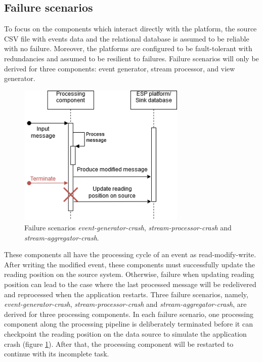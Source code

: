  
\subsection{Failure scenarios}  \label{subsection:failurescenarios}
To focus on the components which interact directly with the platform, the source CSV file with events data and the relational database is assumed to be reliable with no failure. Moreover, the platforms are configured to be fault-tolerant with redundancies and assumed to be resilient to failures.  Failure scenarios will only be derived for three components: event generator, stream processor, and view generator.

\begin{figure}[h]
	\centering
	\includegraphics[width=8cm]{images/reading-position-fail.png}
	\caption{Failure scenarios \emph{event-generator-crash}, \emph{stream-processor-crash} and \emph{stream-aggregator-crash}.}
	\label{fig:scenarioreadingposition}
\end{figure}

These components all have the processing cycle of an event as read-modify-write. After writing the modified event, these components must successfully update the reading position on the source system. Otherwise, failure when updating reading position can lead to the case where the last processed message will be redelivered and reprocessed when the application restarts. Three failure scenarios, namely, \emph{event-generator-crash}, \emph{stream-processor-crash} and \emph{stream-aggregator-crash}, are derived for three processing components. In each failure scenario, one processing component along the processing pipeline is deliberately terminated before it can checkpoint the reading position on the data source to simulate the application crash (figure \ref{fig:scenarioreadingposition}). After that, the processing component will be restarted to continue with its incomplete task.



